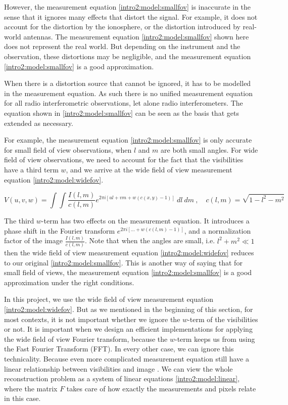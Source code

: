 However, the measurement equation \eqref{intro2:model:smallfov} is inaccurate in the sense that it ignores many effects that distort the signal. For example, it does not account for the distortion by the ionosphere, or the distortion introduced by real-world antennas. The measurement equation \eqref{intro2:model:smallfov} shown here does not represent the real world. But depending on the instrument and the observation, these distortions may be negligible, and the measurement equation \eqref{intro2:model:smallfov} is a good approximation. 

When there is a distortion source that cannot be ignored, it has to be modelled in the measurement equation. As such there is no unified measurement equation for all radio interferometric observations, let alone radio interferometers. The equation shown in \eqref{intro2:model:smallfov} can be seen as the basis that gets extended as necessary\cite{smirnov2011revisiting1, smirnov2011revisiting2, smirnov2011revisiting3, smirnov2011revisiting4}.

For example, the measurement equation \eqref{intro2:model:smallfov} is only accurate for small field of view observations, when $l$ and $m$ are both small angles. For wide field of view observations, we need to account for the fact that the visibilities have a third term $w$, and we arrive at the wide field of view measurement equation \eqref{intro2:model:widefov}.
 
\begin{equation}\label{intro2:model:widefov}
 V(u, v, w) = \int\int  \frac{I(l, m)}{c(l, m)}  e^{2 \pi i [ul+vm+ w(c(x, y) - 1)]} \: dl \: dm \:,  \quad c(l,m) = \sqrt{1 - l^2 - m ^2}
\end{equation}
 
The third $w$-term has two effects on the measurement equation. It introduces a phase shift in the Fourier transform $e^{2 \pi i [\ldots +w(c(l, m) - 1)]}$, and a normalization factor of the image $\frac{I(l, m)}{c(l, m)}$. Note that when the angles are small, i.e. $l^2 +m^2 \ll 1$ then the wide field of view measurement equation \eqref{intro2:model:widefov} reduces to our original \eqref{intro2:model:smallfov}. This is another way of saying that for small field of views, the measurement equation \eqref{intro2:model:smallfov} is a good approximation under the right conditions. 

In this project, we use the wide field of view measurement equation \eqref{intro2:model:widefov}. But as we mentioned in the beginning of this section, for most contexts, it is not important whether we ignore the $w$-term of the visibilities or not. It is important when we design an efficient implementations for applying the wide field of view Fourier transform, because the $w$-term keeps us from using the Fast Fourier Transform (FFT). In every other case, we can ignore this technicality. Because even more complicated measurement equation still have a linear relationship between visibilities and image \cite{smirnov2011revisiting1, smirnov2011revisiting2, smirnov2011revisiting3, smirnov2011revisiting4}. We can view the whole reconstruction problem as a system of linear equations \eqref{intro2:model:linear}, where the matrix $F$ takes care of how exactly the measurements and pixels relate in this case.

